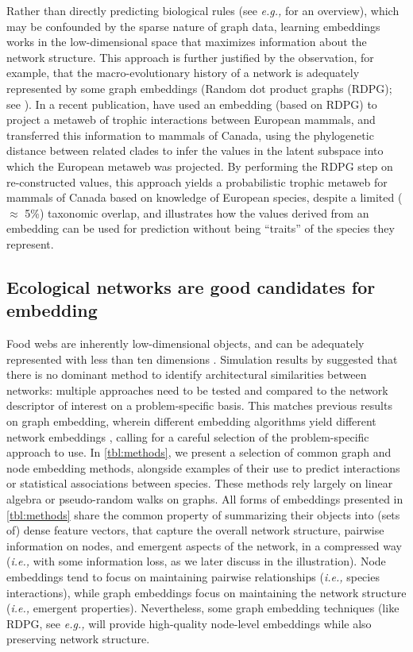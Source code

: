 Rather than directly predicting biological rules (see \emph{e.g.,}
\cite{Pichler2020Machine} for an overview), which may be confounded by the
sparse nature of graph data, learning embeddings works in the
low-dimensional space that maximizes information about the network
structure. This approach is further justified by the observation, for
example, that the macro-evolutionary history of a network is adequately
represented by some graph embeddings (Random dot product graphs
(RDPG); see \cite{DallaRiva2016Exploring}). In a recent publication,
\cite{Strydom2022Food} have used an embedding (based on RDPG) to project a
metaweb of trophic interactions between European mammals, and
transferred this information to mammals of Canada, using the
phylogenetic distance between related clades to infer the values in the
latent subspace into which the European metaweb was projected. By
performing the RDPG step on re-constructed values, this approach yields
a probabilistic trophic metaweb for mammals of Canada based on knowledge
of European species, despite a limited (\(\approx\) 5\%) taxonomic
overlap, and illustrates how the values derived from an embedding can be
used for prediction without being ``traits'' of the species they
represent.

\subsection{Ecological networks are good candidates for
embedding}\label{ecological-networks-are-good-candidates-for-embedding}

Food webs are inherently low-dimensional objects, and can be adequately
represented with less than ten dimensions \cite{Braga2021Phylogenetic,
Eklof2013Dimensionality, Braga2019Spatial}. Simulation results by
\cite{Botella2022Appraisal} suggested that there is no dominant method to
identify architectural similarities between networks: multiple
approaches need to be tested and compared to the network descriptor of
interest on a problem-specific basis. This matches previous results on
graph embedding, wherein different embedding algorithms yield different
network embeddings \cite{Goyal2018Graph}, calling for a careful
selection of the problem-specific approach to use. In \autoref{tbl:methods}, we
present a selection of common graph and node embedding methods,
alongside examples of their use to predict interactions or statistical
associations between species. These methods rely largely on linear
algebra or pseudo-random walks on graphs. All forms of embeddings
presented in \autoref{tbl:methods} share the common property of summarizing their
objects into (sets of) dense feature vectors, that capture the overall
network structure, pairwise information on nodes, and emergent aspects
of the network, in a compressed way (\emph{i.e.,} with some information
loss, as we later discuss in the illustration). Node embeddings tend to
focus on maintaining pairwise relationships (\emph{i.e.,} species
interactions), while graph embeddings focus on maintaining the network
structure (\emph{i.e.,} emergent properties). Nevertheless, some graph
embedding techniques (like RDPG, see \emph{e.g.,} \cite{Wu2021Maximum} will
provide high-quality node-level embeddings while also preserving network
structure.


